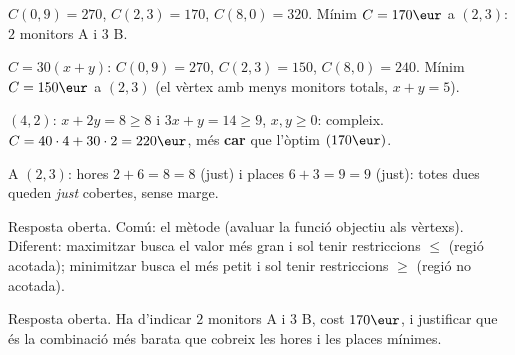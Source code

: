 \begin{solucions}
\begin{sollist}
  \item $C(0,9)=270$, $C(2,3)=170$, $C(8,0)=320$. Mínim $C=170\eur$ a $(2,3)$: $2$
        monitors A i $3$ B.
  \item $C=30(x+y)$: $C(0,9)=270$, $C(2,3)=150$, $C(8,0)=240$. Mínim $C=150\eur$ a
        $(2,3)$ (el vèrtex amb menys monitors totals, $x+y=5$).
  \item $(4,2)$: $x+2y=8\ge 8$ i $3x+y=14\ge 9$, $x,y\ge 0$: compleix.
        $C=40\cdot 4+30\cdot 2=220\eur$, més \textbf{car} que l'òptim $(170\eur)$.
  \item A $(2,3)$: hores $2+6=8=8$ (just) i places $6+3=9=9$ (just): totes dues
        queden \emph{just} cobertes, sense marge.
  \item Resposta oberta. Comú: el mètode (avaluar la funció objectiu als vèrtexs).
        Diferent: maximitzar busca el valor més gran i sol tenir restriccions $\le$
        (regió acotada); minimitzar busca el més petit i sol tenir restriccions $\ge$
        (regió no acotada).
  \item Resposta oberta. Ha d'indicar $2$ monitors A i $3$ B, cost $170\eur$, i
        justificar que és la combinació més barata que cobreix les hores i les places
        mínimes.
\end{sollist}
\end{solucions}
